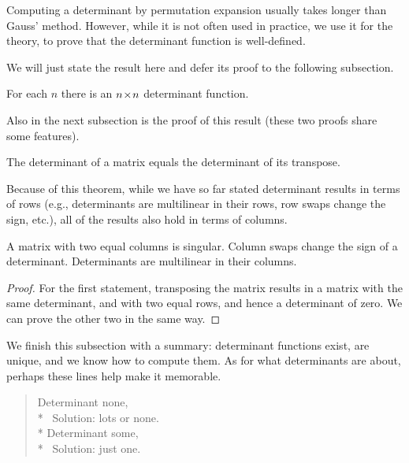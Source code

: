 Computing a determinant by permutation expansion usually takes longer than
Gauss' method.
However, 
while it is not often used in practice, 
we use it for the theory, to prove that 
the determinant function is well-defined.

We will just state the result here and 
defer its proof to the following subsection.


\begin{theorem}
 \label{th:DetsExist}
For each $n$ there is an $n \! \times \! n$ determinant function.
\end{theorem}

Also in the next subsection is the proof of this
result (these two proofs share some features).

\begin{theorem}
The determinant of a matrix equals the determinant of its transpose.
\end{theorem}

Because of this theorem,
while we have so far stated determinant results in terms of rows
(e.g., determinants are multilinear in their rows, row swaps change the
sign, etc.),
all of the results also hold in terms of columns.

\begin{corollary} \label{cor:ColSwapChgSign} \label{cor:DetsMultiInCols}
  A matrix with two equal columns is singular.
  Column swaps change the sign of a determinant.
  Determinants are multilinear in their columns.
\end{corollary}

\begin{proof}
For the first statement, 
transposing the matrix results in a matrix with the same determinant,
and with two equal rows, and hence a determinant of zero.
We can prove the other two in the same way.
\end{proof}

We finish this subsection with a summary:
determinant functions exist, are unique, and we know how to compute them.
As for what determinants are about, perhaps these lines
\cite{Kemp} help make it memorable.
\begin{verse} \small
Determinant none,         \\*
\ Solution: lots or none.   \\*
Determinant some,         \\*
\ Solution: just one.
\end{verse}




